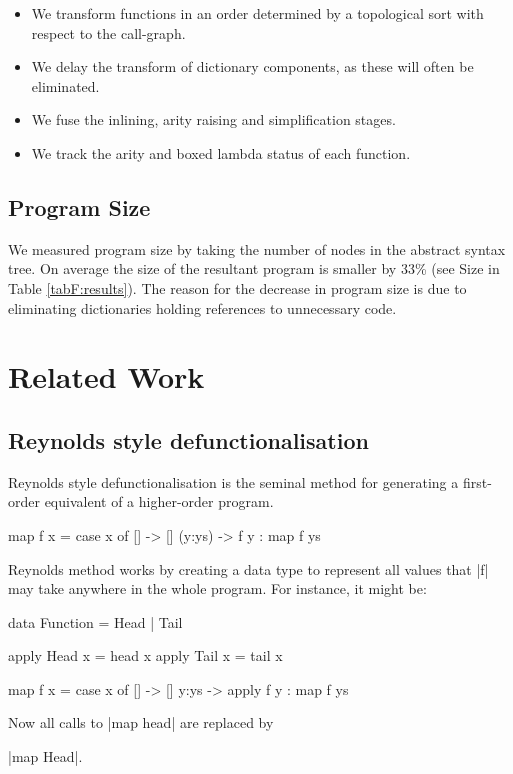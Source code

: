 \begin{itemize}
\item We transform functions in an order determined by a topological sort with respect to the call-graph.
\item We delay the transform of dictionary components, as these will often be eliminated.
\item We fuse the inlining, arity raising and simplification stages.
\item We track the arity and boxed lambda status of each function.
\end{itemize}

\subsection{Program Size}

We measured program size by taking the number of nodes in the abstract syntax tree. On average the size of the resultant program is smaller by 33\% (see Size in Table \ref{tabF:results}). The reason for the decrease in program size is due to eliminating dictionaries holding references to unnecessary code.


\section{Related Work}
\label{secF:related}

\subsection{Reynolds style defunctionalisation}

Reynolds style defunctionalisation \cite{reynolds:defunc} is the seminal method for generating a first-order equivalent of a higher-order program.

\begin{example}
\begin{code}
map f x = case  x of
                []      -> []
                (y:ys)  -> f y : map f ys
\end{code}

\noindent Reynolds method works by creating a data type to represent all values that |f| may take anywhere in the whole program. For instance, it might be:

\ignore\begin{code}
data Function = Head | Tail

apply Head  x = head  x
apply Tail  x = tail  x

map f x = case  x of
                []    -> []
                y:ys  -> apply f y : map f ys
\end{code}

\noindent Now all calls to |map head| are replaced by \ignore|map Head|.
\end{example}

